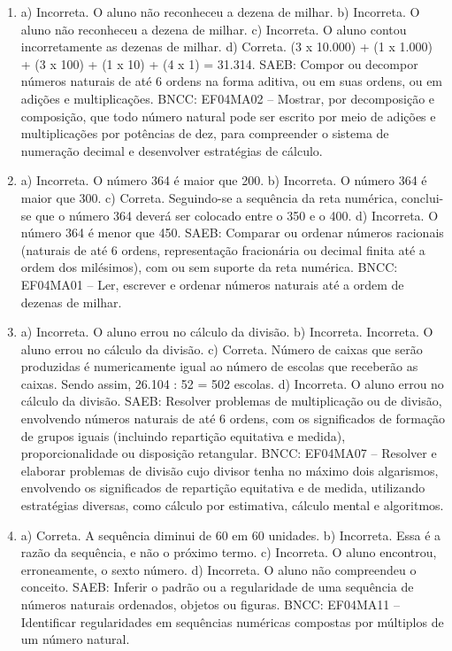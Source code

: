 \begin{enumerate}
\item
a) Incorreta. O aluno não reconheceu a dezena de milhar.
b) Incorreta. O aluno não reconheceu a dezena de milhar.
c) Incorreta. O aluno contou incorretamente as dezenas de milhar.
d) Correta. (3 x 10.000) + (1 x 1.000) + (3 x 100) + (1 x 10) + (4 x 1) = 31.314.
SAEB: Compor ou decompor números naturais de até 6 ordens na
forma aditiva, ou em suas ordens, ou em adições e multiplicações.
BNCC: EF04MA02 -- Mostrar, por decomposição e composição, que todo número natural pode ser escrito
por meio de adições e multiplicações por potências de dez, para compreender o sistema de
numeração decimal e desenvolver estratégias de cálculo.

\item
a) Incorreta. O número 364 é maior que 200.
b) Incorreta. O número 364 é maior que 300.
c) Correta. Seguindo-se a sequência da reta numérica, conclui-se que o número 364 deverá
ser colocado entre o 350 e o 400.
d) Incorreta. O número 364 é menor que 450.
SAEB: Comparar ou ordenar números
racionais (naturais de até 6 ordens, representação fracionária ou
decimal finita até a ordem dos milésimos), com ou sem suporte da reta
numérica.
BNCC: EF04MA01 -- Ler, escrever e ordenar números naturais até a ordem de dezenas de milhar.

\item
a) Incorreta. O aluno errou no cálculo da divisão.
b) Incorreta. Incorreta. O aluno errou no cálculo da divisão.
c) Correta. Número de caixas que serão produzidas é numericamente igual ao número de
escolas que receberão as caixas. Sendo assim, 26.104 : 52 = 502 escolas.
d) Incorreta. O aluno errou no cálculo da divisão.
SAEB: Resolver problemas de multiplicação ou de divisão,
envolvendo números naturais de até 6 ordens, com os significados de
formação de grupos iguais (incluindo repartição equitativa e medida),
proporcionalidade ou disposição retangular.
BNCC: EF04MA07 -- Resolver e elaborar problemas de divisão cujo divisor tenha no máximo dois algarismos,
envolvendo os significados de repartição equitativa e de medida, utilizando estratégias diversas,
como cálculo por estimativa, cálculo mental e algoritmos.

\item
a) Correta. A sequência diminui de 60 em 60 unidades.
b) Incorreta. Essa é a razão da sequência, e não o próximo termo.
c) Incorreta. O aluno encontrou, erroneamente, o sexto número.
d) Incorreta. O aluno não compreendeu o conceito.
SAEB: Inferir o padrão ou a regularidade de uma sequência de
números naturais ordenados, objetos ou figuras.
BNCC: EF04MA11 -- Identificar regularidades em sequências numéricas compostas por múltiplos de um
número natural.


\end{enumerate}
